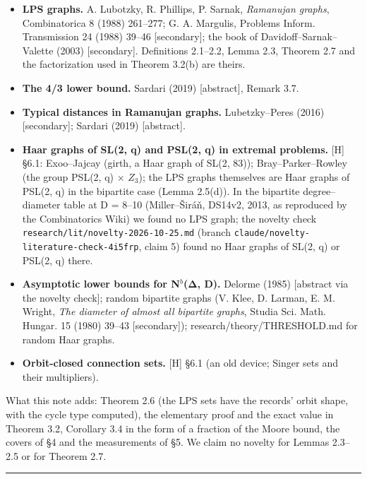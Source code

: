 \documentclass[
  10pt,
]{article}
\providecommand{\tightlist}{%
  \setlength{\itemsep}{0pt}\setlength{\parskip}{0pt}}
\begin{document}
\begin{itemize}
\tightlist
\item
  \textbf{LPS graphs.} A. Lubotzky, R. Phillips, P. Sarnak,
  \emph{Ramanujan graphs}, Combinatorica 8 (1988) 261--277; G. A.
  Margulis, Problems Inform. Transmission 24 (1988) 39--46
  {[}secondary{]}; the book of Davidoff--Sarnak--Valette (2003)
  {[}secondary{]}. Definitions 2.1--2.2, Lemma 2.3, Theorem 2.7 and the
  factorization used in Theorem 3.2(b) are theirs.
\item
  \textbf{The 4/3 lower bound.} Sardari (2019) {[}abstract{]}, Remark
  3.7.
\item
  \textbf{Typical distances in Ramanujan graphs.} Lubetzky--Peres (2016)
  {[}secondary{]}; Sardari (2019) {[}abstract{]}.
\item
  \textbf{Haar graphs of SL(2, q) and PSL(2, q) in extremal problems.}
  {[}H{]} §6.1: Exoo--Jajcay (girth, a Haar graph of SL(2, 83));
  Bray--Parker--Rowley (the group PSL(2, q) × \(Z_{3}\)); the LPS graphs
  themselves are Haar graphs of PSL(2, q) in the bipartite case (Lemma
  2.5(d)). In the bipartite degree--diameter table at D = 8--10
  (Miller--Širáň, DS14v2, 2013, as reproduced by the Combinatorics Wiki)
  we found no LPS graph; the novelty check
  \texttt{research/lit/novelty-2026-10-25.md} (branch
  \texttt{claude/novelty-literature-check-4i5frp}, claim 5) found no
  Haar graphs of SL(2, q) or PSL(2, q) there.
\item
  \textbf{Asymptotic lower bounds for N\(^{b}\)(Δ, D).} Delorme (1985)
  {[}abstract via the novelty check{]}; random bipartite graphs (V.
  Klee, D. Larman, E. M. Wright, \emph{The diameter of almost all
  bipartite graphs}, Studia Sci. Math. Hungar. 15 (1980) 39--43
  {[}secondary{]}); research/theory/THRESHOLD.md for random Haar graphs.
\item
  \textbf{Orbit-closed connection sets.} {[}H{]} §6.1 (an old device;
  Singer sets and their multipliers).
\end{itemize}

What this note adds: Theorem 2.6 (the LPS sets have the records' orbit
shape, with the cycle type computed), the elementary proof and the exact
value in Theorem 3.2, Corollary 3.4 in the form of a fraction of the
Moore bound, the covers of §4 and the measurements of §5. We claim no
novelty for Lemmas 2.3--2.5 or for Theorem 2.7.

\begin{center}\rule{0.5\linewidth}{0.5pt}\end{center}
\end{document}
